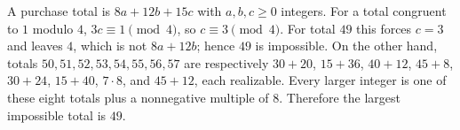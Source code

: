 A purchase total is $8a+12b+15c$ with $a,b,c\ge 0$ integers. For a total congruent to $1$ modulo $4$, $3c\equiv 1\pmod 4$, so $c\equiv 3\pmod 4$. For total $49$ this forces $c=3$ and leaves $4$, which is not $8a+12b$; hence $49$ is impossible. On the other hand, totals $50,51,52,53,54,55,56,57$ are respectively $30+20$, $15+36$, $40+12$, $45+8$, $30+24$, $15+40$, $7\cdot 8$, and $45+12$, each realizable. Every larger integer is one of these eight totals plus a nonnegative multiple of $8$. Therefore the largest impossible total is $\boxed{49}$.
